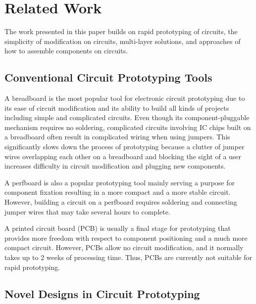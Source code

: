 \section{Related Work}
The work presented in this paper builds on rapid prototyping of circuits, the simplicity of modification on circuits, multi-layer solutions, and approaches of how to assemble components on circuits.

\subsection{Conventional Circuit Prototyping Tools}
A breadboard is the most popular tool for electronic circuit prototyping due to its ease of circuit modification and its ability to build all kinds of projects including simple and complicated circuits. Even though its component-pluggable mechanism requires no soldering, complicated circuits involving IC chips built on a breadboard often result in complicated wiring when using jumpers. This significantly slows down the process of prototyping because a clutter of jumper wires overlapping each other on a breadboard and blocking the sight of a user increases difficulty in circuit modification and plugging new components.

A perfboard is also a popular prototyping tool mainly serving a purpose for component fixation resulting in a more compact and a more stable circuit. However, building a circuit on a perfboard requires soldering and connecting jumper wires that may take several hours to complete.

A printed circuit board (PCB) is usually a final stage for prototyping that provides more freedom with respect to component positioning and a much more compact circuit. However, PCBs allow no circuit modification, and it normally takes up to 2 weeks of processing time. Thus, PCBs are currently not suitable for rapid prototyping.

\subsection{Novel Designs in Circuit Prototyping}

